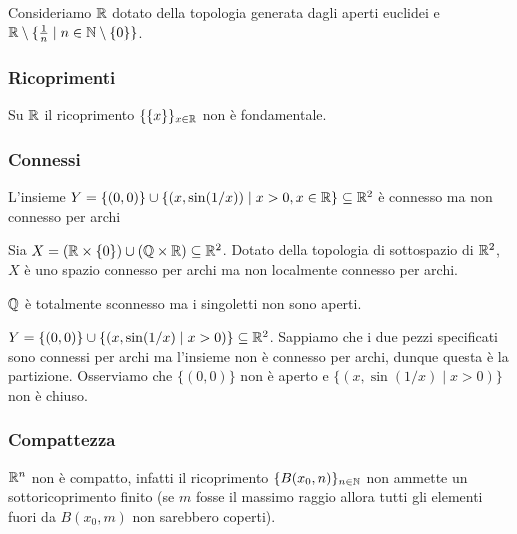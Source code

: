 \begin{multicols*}{2}
\begin{example}\label{EsempioT2NonRegolare}
Consideriamo $\mathbb{R}$ dotato della topologia generata dagli aperti euclidei e $\mathbb{R}\setminus\{\frac1n\mid n\in\mathbb{N}\setminus\{0\}\}$.
\end{example}

\subsubsection{Ricoprimenti}
\begin{example}\label{RicoprimentoChiusoNonFondamentale}
Su $\mathbb{R}$ il ricoprimento $\{\{x\}\}_{x\in \mathbb{R}}$ non \`e fondamentale.
\end{example}

\subsubsection{Connessi}
\begin{example}\label{ConnessoNonConnessoPerArchi}
L'insieme $Y=\{(0,0)\}\cup\{(x,\sin(1/x))\mid x>0,x\in \mathbb{R}\}\subseteq \mathbb{R}^2$ \`e connesso ma non connesso per archi
\end{example}

\begin{example}\label{PettineInfinito}
Sia $X=(\mathbb{R}\times\{0\})\cup(\mathbb{Q}\times \mathbb{R})\subseteq \mathbb{R}^2$. Dotato della topologia di sottospazio di $\mathbb{R}^2$, $X$ \`e uno spazio connesso per archi ma non localmente connesso per archi.
\end{example}

\begin{example}\label{PartiConnesseAperte}
$\mathbb{Q}$ \`e totalmente sconnesso ma i singoletti non sono aperti.
\end{example}

\begin{example}\label{PartiConnessePerArchiNeAperteNeChiuse}
$Y=\{(0,0)\}\cup\{(x,\sin(1/x)\mid x>0)\}\subseteq\mathbb{R}^2$. Sappiamo che i due pezzi specificati sono connessi per archi ma l'insieme non \`e connesso per archi, dunque questa \`e la partizione. Osserviamo che $\{(0,0)\}$ non \`e aperto e $\{(x,\sin(1/x)\mid x>0)\}$ non \`e chiuso.
\end{example}

\subsubsection{Compattezza}
\begin{example}\label{RnNonECompatto}
$\mathbb{R}^n$ non \`e compatto, infatti il ricoprimento $\{B(x_0,n)\}_{n\in \mathbb{N}}$ non ammette un sottoricoprimento finito (se $m$ fosse il massimo raggio allora tutti gli elementi fuori da $B(x_0,m)$ non sarebbero coperti).
\end{example}


\end{multicols*}
